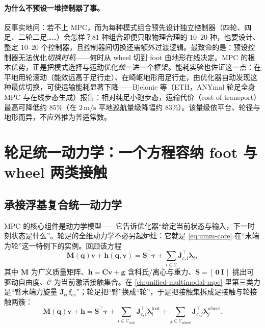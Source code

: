 \paragraph{为什么不预设一堆控制器了事。}
反事实地问：若不上 MPC，而为每种模式组合预先设计独立控制器（四轮、四足、二轮二足……）会怎样？$81$ 种组合即便只取物理合理的 $10$–$20$ 种，也要设计、整定 $10$–$20$ 个控制器，且控制器间切换还需额外过渡逻辑。最致命的是：预设控制器无法优化\emph{切换时机}——何时从 wheel 切到 foot 由地形在线决定。MPC 的根本优势，正是把模式选择与运动优化\emph{统一}进一个框架。能耗实验也佐证这一点：在平地用轮滚动（能效远高于足行走）、在崎岖地形用足行走，由优化器自动发现这种最优切换，可使运输能耗显著下降——Bjelonic 等（ETH，ANYmal 轮足全身 MPC 与在线步态生成）报告：相对纯足小跑步态，运输代价（cost of transport）最高可降低约 $85\%$（在 $2\,\mathrm{m/s}$ 平地巡航量级降幅约 $83\%$）。该量级依平台、轮径与地形而异，不应外推为普适常数。

\section{轮足统一动力学：一个方程容纳 foot 与 wheel 两类接触}
\label{sec:wl-dyn}

\subsection{承接浮基复合统一动力学}

MPC 的核心组件是动力学模型——它告诉优化器“给定当前状态与输入，下一时刻状态是什么”。轮足的全维动力学不必另起炉灶：它就是 \cref{eq:umm-core} 在“末端为轮”这一特例下的实例。回顾该方程
\begin{equation}
  \mathbf{M}(\mathbf{q})\dot{\mathbf{v}}+\mathbf{h}(\mathbf{q},\mathbf{v})
  =\mathbf{S}^\top\boldsymbol\tau+\sum_{i\in\mathcal{C}}\mathbf{J}_{c,i}^\top\boldsymbol\lambda_i,
  \label{eq:wl-fulldyn}
\end{equation}
其中 $\mathbf{M}$ 为广义质量矩阵、$\mathbf{h}=\mathbf{C}\mathbf{v}+\mathbf{g}$ 含科氏/离心与重力、$\mathbf{S}=[\,\mathbf{0}\ \mathbf{I}\,]$ 挑出可驱动自由度、$\mathcal{C}$ 为当前激活接触集合。在 \cref{ch:unified-multimodal-mpc} 里第三类力是“臂末端力旋量 $\mathbf{J}_{\mathrm{ee}}^\top\mathbf{f}_{\mathrm{ee}}$”；轮足把“臂”换成“轮”，于是把接触集拆成足接触与轮接触两簇：
\begin{equation}
  \mathbf{M}(\mathbf{q})\dot{\mathbf{v}}+\mathbf{h}
  =\mathbf{S}^\top\boldsymbol\tau
  +\sum_{i\in\mathcal{C}_{\mathrm{foot}}}\mathbf{J}_{c,i}^\top\boldsymbol\lambda_i^{\mathrm{foot}}
  +\sum_{j\in\mathcal{C}_{\mathrm{wheel}}}\mathbf{J}_{c,j}^\top\boldsymbol\lambda_j^{\mathrm{wheel}}.
  \label{eq:wl-twoclass}
\end{equation}

